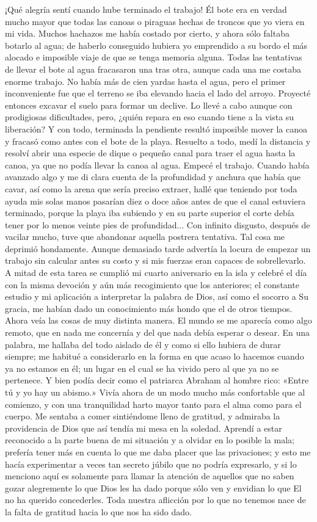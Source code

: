 \documentclass{novela}
\begin{document}
    ¡Qué alegría sentí cuando hube terminado el trabajo! Él bote era en verdad mucho mayor que todas las canoas o piraguas hechas de troncos que yo viera en mi vida. Muchos hachazos me había costado por cierto, y ahora sólo faltaba botarlo al agua; de haberlo conseguido hubiera yo emprendido a su bordo el más alocado e imposible viaje de que se tenga memoria alguna.
    Todas las tentativas de llevar el bote al agua fracasaron una tras otra, aunque cada una me costaba enorme trabajo. No había más de cien yardas hasta el agua, pero el primer inconveniente fue que el terreno se iba elevando hacia el lado del arroyo. Proyecté entonces excavar el suelo para formar un declive. Lo llevé a cabo aunque con prodigiosas dificultades, pero, ¿quién repara en eso cuando tiene a la vista su liberación? Y con todo, terminada la pendiente resultó imposible mover la canoa y fracasó como antes con el bote de la playa.
    Resuelto a todo, medí la distancia y resolví abrir una especie de dique o pequeño canal para traer el agua hasta la canoa, ya que no podía llevar la canoa al agua. Empecé el trabajo. Cuando había avanzado algo y me di clara cuenta de la profundidad y anchura que había que cavar, así como la arena que sería preciso extraer, hallé que teniendo por toda ayuda mis solas manos pasarían diez o doce años antes de que el canal estuviera terminado, porque la playa iba subiendo y en su parte superior el corte debía tener por lo menos veinte pies de profundidad... Con infinito disgusto, después de vacilar mucho, tuve que abandonar aquella postrera tentativa.
    Tal cosa me deprimió hondamente. Aunque demasiado tarde advertía la locura de empezar un trabajo sin calcular antes su costo y si mis fuerzas eran capaces de sobrellevarlo.
    A mitad de esta tarea se cumplió mi cuarto aniversario en la isla y celebré el día con la misma devoción y aún más recogimiento que los anteriores; el constante estudio y mi aplicación a interpretar la palabra de Dios, así como el socorro a Su gracia, me habían dado un conocimiento más hondo que el de otros tiempos. Ahora veía las cosas de muy distinta manera. El mundo se me aparecía como algo remoto, que en nada me concernía y del que nada debía esperar o desear. En una palabra, me hallaba del todo aislado de él y como si ello hubiera de durar siempre; me habitué a considerarlo en la forma en que acaso lo hacemos cuando ya no estamos en él; un lugar en el cual se ha vivido pero al que ya no se pertenece. Y bien podía decir como el patriarca Abraham al hombre rico: «Entre tú y yo hay un abismo.»
    Vivía ahora de un modo mucho más confortable que al comienzo, y con una tranquilidad harto mayor tanto para el alma como para el cuerpo. Me sentaba a comer sintiéndome lleno de gratitud, y admiraba la providencia de Dios que así tendía mi mesa en la soledad. Aprendí a estar reconocido a la parte buena de mi situación y a olvidar en lo posible la mala; prefería tener más en cuenta lo que me daba placer que las privaciones; y esto me hacía experimentar a veces tan secreto júbilo que no podría expresarlo, y si lo menciono aquí es solamente para llamar la atención de aquellos que no saben gozar alegremente lo que Dios les ha dado porque sólo ven y envidian lo que El no ha querido concederles. Toda nuestra aflicción por lo que no tenemos nace de la falta de gratitud hacia lo que nos ha sido dado.
\end{document}
